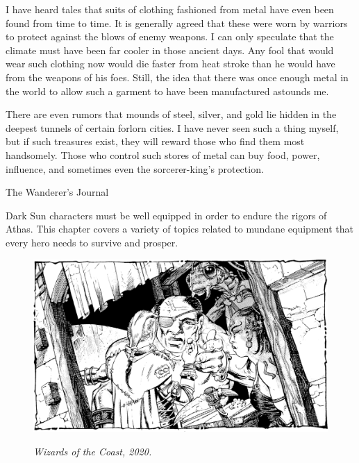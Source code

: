 {I have heard tales that suits of clothing fashioned from metal have even been found from time to time. It is generally agreed that these were worn by warriors to protect against the blows of enemy weapons. I can only speculate that the climate must have been far cooler in those ancient days. Any fool that would wear such clothing now would die faster from heat stroke than he would have from the weapons of his foes. Still, the idea that there was once enough metal in the world to allow such a garment to have been manufactured astounds me.

There are even rumors that mounds of steel, silver, and gold lie hidden in the deepest tunnels of certain forlorn cities. I have never seen such a thing myself, but if such treasures exist, they will reward those who find them most handsomely. Those who control such stores of metal can buy food, power, influence, and sometimes even the sorcerer-king's protection.}
{The Wanderer's Journal}

Dark Sun characters must be well equipped in order to endure the rigors of Athas. This chapter covers a variety of topics related to mundane equipment that every hero needs to survive and prosper.



\begin{figure}[t!]
\centering
\includegraphics[width=\textwidth]{images/bribe-2.png}
\par\textit{\small\textcopyright Wizards of the Coast, 2020.}
\end{figure}







